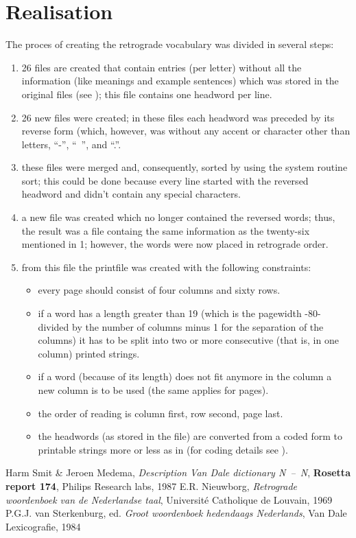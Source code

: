 \section{Realisation}
 The proces of creating the retrograde vocabulary was divided in several steps:
 \begin{enumerate}
 \item 26 files are created that contain entries (per letter) without all the 
  information (like meanings and example sentences) which was stored in the 
  original files (see \cite{sm:descr}); this file contains one headword per 
  line.
 \item 26 new files were created; in these files each headword was preceded by 
  its reverse form (which, however, was without any accent or character other
  than letters, ``-'', ``~'', and ``.''.
 \item these files were merged and, consequently, sorted by using the system 
  routine sort; this could be done because every line started 
  with the reversed headword and didn't contain any special characters.
 \item a new file was created which no longer contained the reversed words;
  thus, the result was a file containg the same information as the twenty-six
  mentioned in 1; however, the words were now placed in retrograde order.
 \item from this file the printfile was created with the following constraints:
  \begin{itemize}
   \item every page should consist of four columns and sixty rows.
   \item if a word has a length greater than 19 (which is the pagewidth -80-
    divided by the 
    number of columns minus 1 for the separation of the columns) it has to be 
    split into two or more consecutive (that is, in one column) printed strings.
   \item if a word (because of its length) does not fit anymore in the column
    a new column is to be used (the same applies for pages).
   \item the order of reading is column first, row second, page last.
   \item the headwords (as stored in the file) are converted from a coded form 
    to printable strings more or less as in \cite{st:groot} (for coding details 
    see \cite{sm:descr}).
  \end{itemize}
 \end{enumerate}
\begin{thebibliography}{AAA99a}
  Harm Smit \& Jeroen Medema, {\em Description Van 
  Dale dictionary N~--~N}, {\bf Rosetta report 174}, Philips Research labs, 
  1987
  E.R. Nieuwborg, {\em Retrograde woordenboek van de 
  Nederlandse taal}, Universit\'{e} Catholique de Louvain, 1969
  P.G.J. van Sterkenburg, ed. {\em Groot woordenboek 
  hedendaags Nederlands}, Van Dale Lexicografie, 1984
\end{thebibliography}

